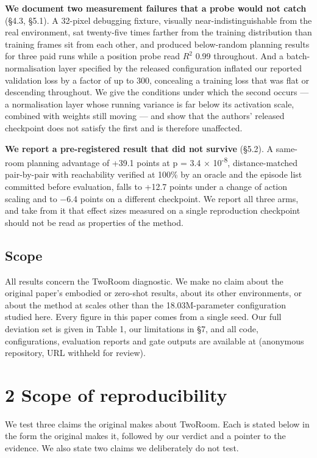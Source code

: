 \documentclass[10pt]{article}
\begin{document}
\textbf{We document two measurement failures that a probe would not catch} (\S{}4.3,
\S{}5.1). A 32-pixel debugging fixture, visually near-indistinguishable from the
real environment, sat twenty-five times farther from the training distribution
than training frames sit from each other, and produced below-random planning
results for three paid runs while a position probe read $R^{2}$ 0.99 throughout. And
a batch-normalisation layer specified by the released configuration inflated our reported validation loss by a factor of up to 300, concealing a
training loss that was flat or descending throughout. We give the
conditions under which the second occurs --- a normalisation layer whose running
variance is far below its activation scale, combined with weights still moving
--- and show that the authors' released checkpoint does not satisfy the first
and is therefore unaffected.

\textbf{We report a pre-registered result that did not survive} (\S{}5.2). A same-room
planning advantage of +39.1 points at p = 3.4 $\times$ 10\textsuperscript{-8}, distance-matched
pair-by-pair with reachability verified at 100\% by an oracle and the episode
list committed before evaluation, falls to +12.7 points under a change of action
scaling and to $-$6.4 points on a different checkpoint. We report all three arms,
and take from it that effect sizes measured on a single reproduction checkpoint
should not be read as properties of the method.

\subsection{Scope}\label{scope}

All results concern the TwoRoom diagnostic. We make no claim about the original
paper's embodied or zero-shot results, about its other environments, or about
the method at scales other than the 18.03M-parameter configuration studied here.
Every figure in this paper comes from a single seed. Our full deviation set is
given in Table 1, our limitations in \S{}7, and all code, configurations,
evaluation reports and gate outputs are available at (anonymous repository, URL withheld for review).

\section{2 Scope of reproducibility}\label{scope-of-reproducibility}

We test three claims the original makes about TwoRoom. Each is stated below in
the form the original makes it, followed by our verdict and a pointer to the
evidence. We also state two claims we deliberately do not test.
\end{document}

